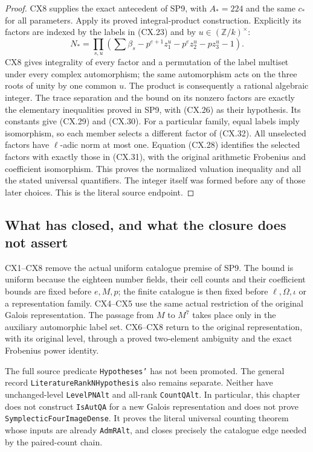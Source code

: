 \begin{proof}
CX8 supplies the exact antecedent of SP9, with $A_*=224$
and the same $c_*$ for all parameters.  Apply its proved
integral-product construction.  Explicitly its factors
are indexed by the labels in (CX.23) and by
$u\in(\mathbb Z/k)^\times$:
\[
 N_* =\prod_{s,u}
 \left(\sum\beta_s-
     p^{e+1}z_1^u-p^e z_2^u-pz_3^u-1\right).                 \tag{CX.32}
\]
CX8 gives integrality of every factor and a permutation
of the label multiset under every complex automorphism;
the same automorphism acts on the three roots of unity
by one common $u$.  The product is consequently a
rational algebraic integer.  The trace separation and
the bound on its nonzero factors are exactly the
elementary inequalities proved in SP9, with (CX.26)
as their hypothesis.  Its constants give (CX.29) and
(CX.30).  For a particular family, equal labels imply
isomorphism, so each member selects a different factor
of (CX.32).  All unselected factors have $\ell$-adic
norm at most one.  Equation (CX.28) identifies the
selected factors with exactly those in (CX.31), with
the original arithmetic Frobenius and coefficient
isomorphism.  This proves the normalized valuation
inequality and all the stated universal quantifiers.
The integer itself was formed before any of those
later choices.  This is the literal source endpoint.
\end{proof}

\subsection{What has closed, and what the closure does not assert}

CX1--CX8 remove the actual uniform catalogue premise of
SP9.  The bound is uniform because the eighteen number
fields, their cell counts and their coefficient bounds
are fixed before $e,M,p$; the finite catalogue is then
fixed before $\ell,\Omega,\iota$ or a representation
family.  CX4--CX5 use the same actual restriction of
the original Galois representation.  The passage from
$M$ to $M^7$ takes place only in the auxiliary
automorphic label set.  CX6--CX8 return to the original
representation, with its original level, through a
proved two-element ambiguity and the exact Frobenius
power identity.

The full source predicate \texttt{Hypotheses'} has not been promoted.
The general record \texttt{Literature\allowbreak RankN\allowbreak Hypothesis} also remains
separate.  Neither have unchanged-level
\texttt{LevelPNAlt} and all-rank \texttt{CountQAlt}.
In particular, this chapter
does not construct \texttt{IsAutQA} for a new Galois
representation and does not prove
\texttt{SymplecticFourImageDense}.  It proves the
literal universal counting theorem whose inputs are
already \texttt{AdmRAlt}, and closes precisely the
catalogue edge needed by the paired-count chain.

